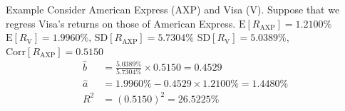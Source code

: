 \documentclass{beamer}
\begin{document}
\begin{frame}{Example}
	Consider American Express (AXP) and Visa (V). Suppose that we regress Visa's returns on those of American Express.  $\text{E}[R_{\text{AXP}}]=1.2100\%$ $\text{E}[R_{\text{V}}]=1.9960\%$, $\text{SD}[R_{\text{AXP}}]=5.7304\%$ $\text{SD}[R_{\text{V}}]=5.0389\%$, $\text{Corr}[R_{\text{AXP}}]=0.5150$
	\pause
	{\color{blue}
	\begin{align*}	
		\hat{b}&=\frac{5.0389\%}{5.7304\%}\times0.5150=0.4529\\
		\hat{a}&=1.9960\%-0.4529\times1.2100\%=1.4480\%\\
		R^{2}&=(0.5150)^2=26.5225\%
	\end{align*}
	}
\end{frame}
\end{document}
